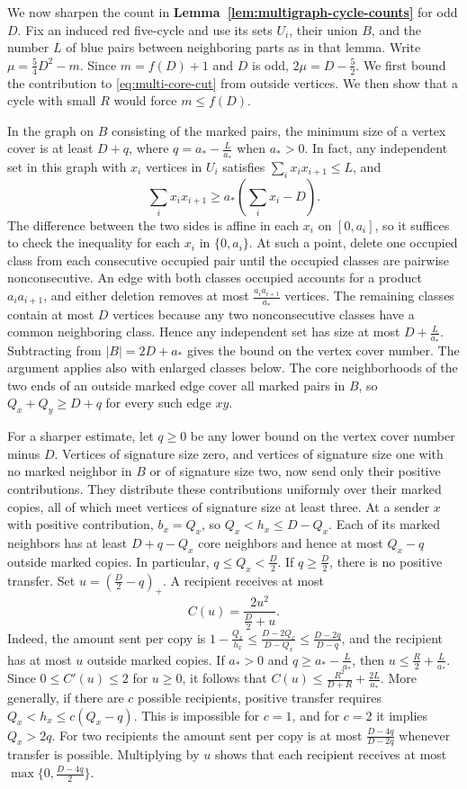 We now sharpen the count in \textbf{Lemma~\ref{lem:multigraph-cycle-counts}}
for odd $D$. Fix an induced red five-cycle and use its sets $U_i$,
their union $B$, and the number $L$ of blue pairs between neighboring
parts as in that lemma. Write $\mu=\frac{5}{4}D^2-m$. Since $m=f(D)+1$ and $D$ is odd,
$2\mu=D-\frac{5}{2}$. We first bound the contribution to
\eqref{eq:multi-core-cut} from outside vertices. We then show that a cycle
with small $R$ would force $m\le f(D)$.

In the graph on $B$ consisting of the marked pairs, the minimum size
of a vertex cover is at least $D+q$, where $q=a_*-\frac{L}{a_*}$
when $a_*>0$. In fact, any independent set in this graph with $x_i$
vertices in $U_i$ satisfies $\sum_i x_i x_{i+1}\le L$, and
\[
 \sum_i x_i x_{i+1}\ge a_*\left(\sum_i x_i-D\right).
\]
The difference between the two sides is affine in each $x_i$ on
$[0,a_i]$, so it suffices to check the inequality for each $x_i$ in
$\{0,a_i\}$. At such a point, delete one occupied class from each
consecutive occupied pair until the occupied classes are pairwise
nonconsecutive. An edge with both classes occupied accounts for a
product $a_i a_{i+1}$, and either deletion removes at most
$\frac{a_i a_{i+1}}{a_*}$ vertices. The remaining classes contain at
most $D$ vertices because any two nonconsecutive classes have a
common neighboring class. Hence any independent set has size at most
$D+\frac{L}{a_*}$. Subtracting from $|B|=2D+a_*$ gives the bound on
the vertex cover number. The argument applies also with enlarged
classes below. The core neighborhoods of the two ends of an outside
marked edge cover all marked pairs in $B$, so $Q_x+Q_y\ge D+q$ for
every such edge $xy$.

For a sharper estimate, let $q\ge0$ be any lower bound on the vertex
cover number minus $D$. Vertices of signature size zero, and vertices
of signature size one with no marked neighbor in $B$ or of signature
size two, now send only their positive contributions. They distribute
these contributions uniformly over their marked copies, all of which
meet vertices of signature size at least three. At a sender $x$ with
positive contribution, $b_x=Q_x$, so $Q_x<h_x\le D-Q_x$.
Each of its marked neighbors has at least $D+q-Q_x$ core neighbors
and hence at most $Q_x-q$ outside marked copies. In particular,
$q\le Q_x<\frac{D}{2}$. If $q\ge\frac{D}{2}$, there is no positive
transfer. Set $u=(\frac{D}{2}-q)_+$. A recipient receives at most
\[
 C(u)=\frac{2u^2}{\frac{D}{2}+u}.
\]
Indeed, the amount sent per copy is
$1-\frac{Q_x}{h_x}\le\frac{D-2Q_x}{D-Q_x}\le\frac{D-2q}{D-q}$,
and the recipient has at most $u$ outside marked copies. If $a_*>0$
and $q\ge a_*-\frac{L}{a_*}$, then $u\le\frac{R}{2}+\frac{L}{a_*}$.
Since $0\le C'(u)\le2$ for $u\ge0$, it follows that
$C(u)\le\frac{R^2}{D+R}+\frac{2L}{a_*}$.
More generally, if there are $c$ possible recipients, positive
transfer requires $Q_x<h_x\le c(Q_x-q)$. This is impossible for $c=1$,
and for $c=2$ it implies $Q_x>2q$. For two recipients the amount
sent per copy is at most $\frac{D-4q}{D-2q}$ whenever transfer
is possible. Multiplying by $u$ shows that each recipient receives
at most $\max\{0,\frac{D-4q}{2}\}$.

